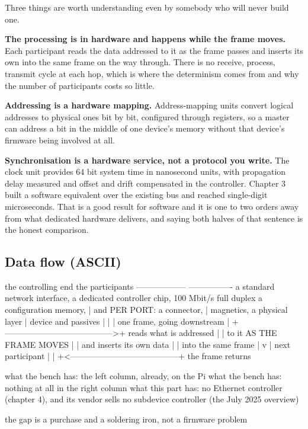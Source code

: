 Three things are worth understanding even by somebody who will never build one.

\textbf{The processing is in hardware and happens while the frame moves.} Each
participant reads the data addressed to it as the frame passes and inserts its
own into the same frame on the way through. There is no receive, process,
transmit cycle at each hop, which is where the determinism comes from and why
the number of participants costs so little.

\textbf{Addressing is a hardware mapping.} Address-mapping units convert logical
addresses to physical ones bit by bit, configured through registers, so a master
can address a bit in the middle of one device's memory without that device's
firmware being involved at all.

\textbf{Synchronisation is a hardware service, not a protocol you write.} The
clock unit provides 64 bit system time in nanosecond units, with propagation
delay measured and offset and drift compensated in the controller. Chapter 3
built a software equivalent over the existing bus and reached single-digit
microseconds. That is a good result for software and it is one to two orders
away from what dedicated hardware delivers, and saying both halves of that
sentence is the honest comparison.

\subsection*{Data flow (ASCII)}

\begin{asciiart}
  the controlling end                    the participants
  ------------------                     ----------------
  a standard network interface,          a dedicated controller chip,
  100 Mbit/s full duplex                 a configuration memory,
        |                                and PER PORT: a connector,
        |                                magnetics, a physical layer
        |                                device and passives
        |                                        |
        |   one frame, going downstream          |
        +--------------------------------------->+  reads what is addressed
        |                                        |  to it AS THE FRAME MOVES
        |                                        |  and inserts its own data
        |                                        |  into the same frame
        |                                        v
        |                                    next participant
        |                                        |
        +<---------------------------------------+  the frame returns

  what the bench has:   the left column, already, on the Pi
  what the bench has:   nothing at all in the right column
  what this part has:   no Ethernet controller (chapter 4), and its vendor
                        sells no subdevice controller (the July 2025 overview)

  the gap is a purchase and a soldering iron, not a firmware problem
\end{asciiart}

